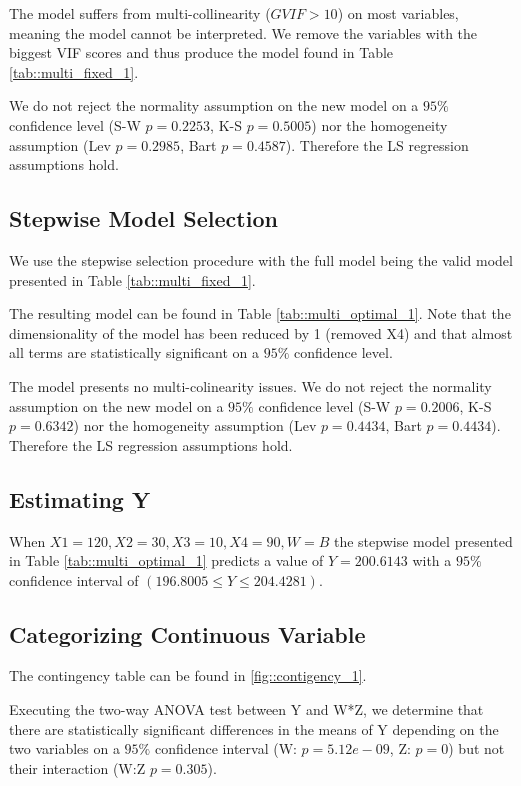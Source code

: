 \documentclass[12pt, a4paper]{article}
\begin{document}
	The model suffers from multi-collinearity ($GVIF > 10$) on most variables, meaning the model cannot be interpreted. We remove the variables with the biggest VIF scores and thus produce the model found in Table \ref{tab::multi_fixed_1}.
	
	We do not reject the normality assumption on the new model on a $95\%$ confidence level (S-W $p=0.2253$, K-S $p=0.5005$) nor the homogeneity assumption (Lev $p=0.2985$, Bart $p=0.4587$). Therefore the LS regression assumptions hold.
	
 	
 	
 	
 	\subsection{Stepwise Model Selection}
	
	We use the stepwise selection procedure with the full model being the valid model presented in Table \ref{tab::multi_fixed_1}.
	
	The resulting model can be found in Table \ref{tab::multi_optimal_1}. Note that the dimensionality of the model has been reduced by 1 (removed X4) and that almost all terms are statistically significant on a $95\%$ confidence level.
	
	The model presents no multi-colinearity issues. We do not reject the normality assumption on the new model on a $95\%$ confidence level (S-W $p=0.2006$, K-S $p=0.6342$) nor the homogeneity assumption (Lev $p=0.4434$, Bart $p=0.4434$). Therefore the LS regression assumptions hold.
	
	
	
	
	\subsection{Estimating Y}
	
	When $X1=120, X2=30, X3=10, X4=90, W=B$ the stepwise model presented in Table \ref{tab::multi_optimal_1} predicts a value of $Y=200.6143$ with a $95\%$ confidence interval of $(196.8005 \leq Y \leq 204.4281)$.
	
	
	\subsection{Categorizing Continuous Variable}
	The contingency table can be found in \ref{fig::contigency_1}.
	
	Executing the two-way ANOVA test between Y and W*Z, we determine that there are statistically significant differences in the means of Y depending on the two variables on a $95\%$ confidence interval (W: $p=5.12e-09$, Z: $p=0$) but not their interaction (W:Z $p= 0.305$). 
	
\end{document}
